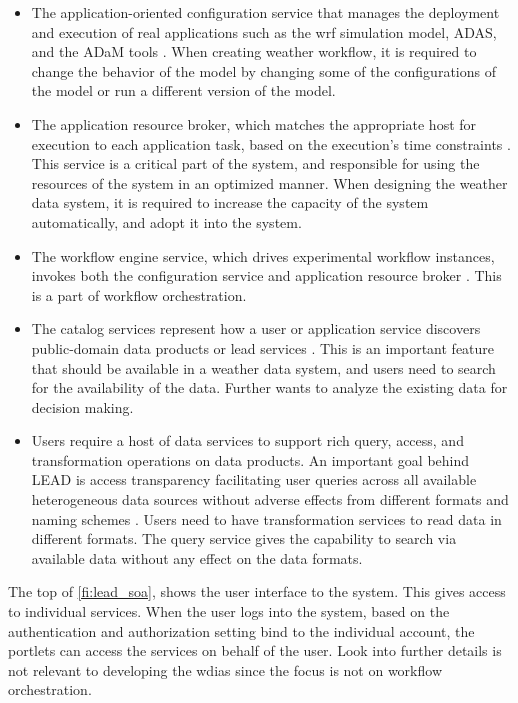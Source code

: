 \begin{itemize}
\item The application-oriented configuration service that manages the deployment and execution of real applications such as the \acrshort{wrf} simulation model, ADAS, and the ADaM tools \cite{Droegemeier2005Service-OrientedWeather}. When creating weather workflow, it is required to change the behavior of the model by changing some of the configurations of the model or run a different version of the model.
\item The application resource broker, which matches the appropriate host for execution to each application task, based on the execution’s time constraints \cite{Droegemeier2005Service-OrientedWeather}. This service is a critical part of the system, and responsible for using the resources of the system in an optimized manner. When designing the weather data system, it is required to increase the capacity of the system automatically, and adopt it into the system.
\item The workflow engine service, which drives experimental workflow instances, invokes both the configuration service and application resource broker \cite{Droegemeier2005Service-OrientedWeather}. This is a part of workflow orchestration.
\item The catalog services represent how a user or application service discovers public-domain data products or \acrshort{lead} services \cite{Droegemeier2005Service-OrientedWeather}. This is an important feature that should be available in a weather data system, and users need to search for the availability of the data. Further wants to analyze the existing data for decision making.
\item Users require a host of data services to support rich query, access, and transformation operations on data products. An important goal behind LEAD is access transparency facilitating user queries across all available heterogeneous data sources without adverse effects from different formats and naming schemes \cite{Droegemeier2005Service-OrientedWeather}. Users need to have transformation services to read data in different formats. The query service gives the capability to search via available data without any effect on the data formats.
\end{itemize}
The top of \cref{fi:lead_soa}, shows the user interface to the system. This gives access to individual services. When the user logs into the system, based on the authentication and authorization setting bind to the individual account, the portlets can access the services on behalf of the user. Look into further details is not relevant to developing the \acrshort{wdias} since the focus is not on workflow orchestration.

